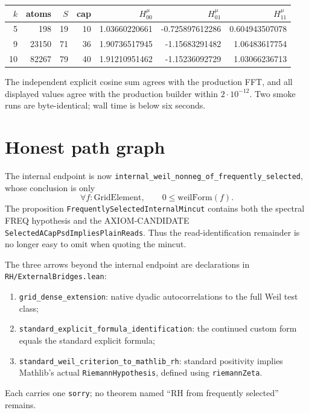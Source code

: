 \documentclass[10pt]{article}
\newcommand{\code}[1]{\nolinkurl{#1}}
\begin{document}
\begin{center}
\small
\begin{tabular}{@{}rrrrrrr@{}}
\toprule
$k$ & atoms & $S$ & cap & $H_{00}^{\mu}$ & $H_{01}^{\mu}$ & $H_{11}^{\mu}$\\
\midrule
5  & 198   & 19 & 10 & 1.03660220661 & -0.725897612286 & 0.604943507078\\
9  & 23150 & 71 & 36 & 1.90736517945 & -1.15683291482  & 1.06483617754\\
10 & 82267 & 79 & 40 & 1.91210951462 & -1.15236092729  & 1.03066236713\\
\bottomrule
\end{tabular}
\end{center}
The independent explicit cosine sum agrees with the production FFT,
and all displayed values agree with the production builder within
$2\cdot10^{-12}$.  Two smoke runs are byte-identical; wall time is
below six seconds.

\section{Honest path graph}
The internal endpoint is now
\code{internal_weil_nonneg_of_frequently_selected}, whose conclusion
is only
\[
  \forall f:\mathrm{GridElement},\qquad 0\le\mathrm{weilForm}(f).
\]
The proposition \code{FrequentlySelectedInternalMincut} contains both
the spectral FREQ hypothesis and the AXIOM-CANDIDATE
\code{SelectedACapPsdImpliesPlainReads}.  Thus the read-identification
remainder is no longer easy to omit when quoting the mincut.

The three arrows beyond the internal endpoint are declarations in
\code{RH/ExternalBridges.lean}:
\begin{enumerate}
\item \code{grid_dense_extension}: native dyadic autocorrelations to
the full Weil test class;
\item \code{standard_explicit_formula_identification}: the continued
custom form equals the standard explicit formula;
\item \code{standard_weil_criterion_to_mathlib_rh}: standard
positivity implies Mathlib's actual \code{RiemannHypothesis}, defined
using \code{riemannZeta}.
\end{enumerate}
Each carries one \code{sorry}; no theorem named ``RH from frequently
selected'' remains.
\end{document}
